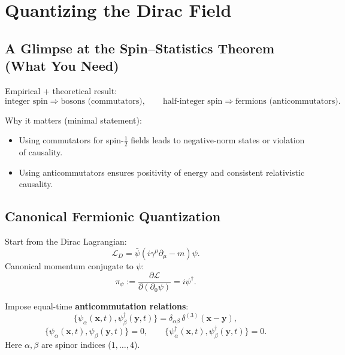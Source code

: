 \section{Quantizing the Dirac Field}

\subsection{A Glimpse at the Spin--Statistics Theorem (What You Need)}
Empirical + theoretical result:
\begin{equation}
\text{integer spin} \Rightarrow \text{bosons (commutators)}, 
\qquad
\text{half-integer spin} \Rightarrow \text{fermions (anticommutators)}.
\end{equation}

Why it matters (minimal statement):
\begin{itemize}
\item Using commutators for spin-$\frac12$ fields leads to negative-norm states or violation of causality.
\item Using anticommutators ensures positivity of energy and consistent relativistic causality.
\end{itemize}

\subsection{Canonical Fermionic Quantization}
Start from the Dirac Lagrangian:
\begin{equation}
\mathcal{L}_D=\bar{\psi}(i\gamma^\mu\partial_\mu-m)\psi.
\end{equation}
Canonical momentum conjugate to $\psi$:
\begin{equation}
\pi_\psi := \frac{\partial\mathcal{L}}{\partial(\partial_0\psi)} = i\psi^\dagger.
\end{equation}

Impose equal-time \textbf{anticommutation relations}:
\begin{equation}
\{\psi_\alpha(\mathbf{x},t),\psi_\beta^\dagger(\mathbf{y},t)\}
=
\delta_{\alpha\beta}\,\delta^{(3)}(\mathbf{x}-\mathbf{y}),
\end{equation}
\begin{equation}
\{\psi_\alpha(\mathbf{x},t),\psi_\beta(\mathbf{y},t)\}=0,
\qquad
\{\psi_\alpha^\dagger(\mathbf{x},t),\psi_\beta^\dagger(\mathbf{y},t)\}=0.
\end{equation}
Here $\alpha,\beta$ are spinor indices ($1,\dots,4$).

